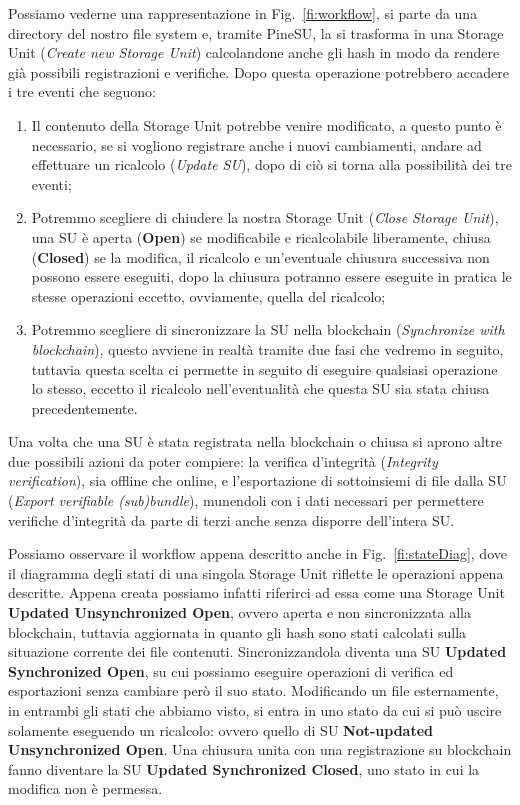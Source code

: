 Possiamo vederne una rappresentazione in Fig.~\ref{fi:workflow}, si parte da una directory del nostro file
system e, tramite PineSU, la si trasforma in una Storage Unit (\emph{Create new Storage Unit}) calcolandone
anche gli hash in modo da rendere già possibili registrazioni e verifiche.
Dopo questa operazione potrebbero accadere i tre eventi che seguono: 
\begin{enumerate}
    \item Il contenuto della Storage Unit potrebbe venire modificato,
    a questo punto è necessario, se si vogliono registrare anche i nuovi cambiamenti,
    andare ad effettuare un ricalcolo (\emph{Update SU}), dopo di ciò
    si torna alla possibilità dei tre eventi;
    \item Potremmo scegliere di chiudere la nostra Storage Unit (\emph{Close Storage Unit}),
    una SU è aperta (\textbf{Open}) se modificabile e ricalcolabile liberamente,
    chiusa (\textbf{Closed}) se la modifica, il ricalcolo e un’eventuale chiusura
    successiva non possono essere eseguiti, dopo la chiusura potranno essere eseguite
    in pratica le stesse operazioni eccetto, ovviamente, quella del ricalcolo;
    \item Potremmo scegliere di sincronizzare la SU nella blockchain (\emph{Synchronize with blockchain}),
    questo avviene in realtà tramite due fasi che vedremo in seguito, tuttavia
    questa scelta ci permette in seguito di eseguire qualsiasi operazione lo stesso,
    eccetto il ricalcolo nell’eventualità che questa SU sia stata chiusa precedentemente.
\end{enumerate}

Una volta che una SU è stata registrata nella blockchain o chiusa si aprono altre
due possibili azioni da poter compiere: la verifica d’integrità (\emph{Integrity verification}),
sia offline che online, e l’esportazione di sottoinsiemi di file dalla SU (\emph{Export verifiable (sub)bundle}),
munendoli con i dati necessari per permettere verifiche d’integrità da parte di terzi
anche senza disporre dell’intera SU.


Possiamo osservare il workflow appena descritto anche in Fig.~\ref{fi:stateDiag}, dove il diagramma degli
stati di una singola Storage Unit riflette le operazioni appena descritte.
Appena creata possiamo infatti riferirci ad essa come una Storage Unit \textbf{Updated Unsynchronized Open},
ovvero aperta e non sincronizzata alla blockchain, tuttavia aggiornata in quanto gli hash sono stati calcolati
sulla situazione corrente dei file contenuti. Sincronizzandola diventa una SU \textbf{Updated Synchronized Open},
su cui possiamo eseguire operazioni di verifica ed esportazioni senza cambiare però il suo stato.
Modificando un file esternamente, in entrambi gli stati che abbiamo visto, si entra in uno stato da cui si
può uscire solamente eseguendo un ricalcolo: ovvero quello di SU \textbf{Not-updated Unsynchronized Open}.
Una chiusura unita con una registrazione su blockchain fanno diventare la SU
\textbf{Updated Synchronized Closed}, uno stato in cui la modifica non è permessa.


